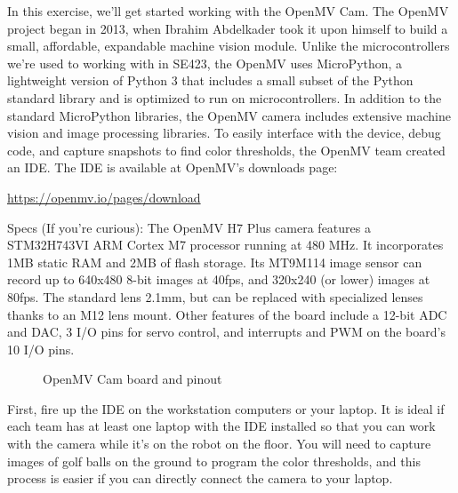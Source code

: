 \documentclass[11pt]{article}
\begin{document}
In this exercise, we’ll get started working with the OpenMV Cam. The OpenMV project began in 2013, when Ibrahim Abdelkader took it upon himself to build a small, affordable, expandable machine vision module. Unlike the microcontrollers we’re used to working with in SE423, the OpenMV uses MicroPython, a lightweight version of Python 3 that includes a small subset of the Python standard library and is optimized to run on microcontrollers. In addition to the standard MicroPython libraries, the OpenMV camera includes extensive machine vision and image processing libraries. To easily interface with the device, debug code, and capture snapshots to find color thresholds, the OpenMV team created an IDE. The IDE is available at OpenMV’s downloads page:
%
\begin{center}
    \url{https://openmv.io/pages/download}
\end{center}
%
Specs (If you’re curious): The OpenMV H7 Plus camera features a STM32H743VI ARM Cortex M7 processor running at 480 MHz. It incorporates 1MB static RAM and 2MB of flash storage. Its MT9M114 image sensor can record up to 640x480 8-bit images at 40fps, and 320x240 (or lower) images at 80fps. The standard lens 2.1mm, but can be replaced with specialized lenses thanks to an M12 lens mount. Other features of the board include a 12-bit ADC and DAC, 3 I/O pins for servo control, and interrupts and PWM on the board’s 10 I/O pins.
%
\begin{figure}[H]
    \centering
    \caption{OpenMV Cam board and pinout}
\end{figure}
%
First, fire up the IDE on the workstation computers or your laptop. It is ideal if each team has at least one laptop with the IDE installed so that you can work with the camera while it’s on the robot on the floor. You will need to capture images of golf balls on the ground to program the color thresholds, and this process is easier if you can directly connect the camera to your laptop.
\end{document}
